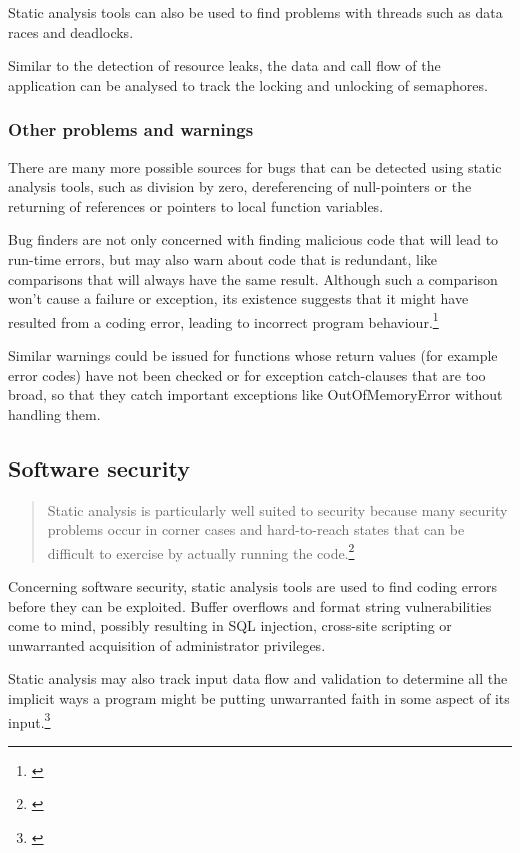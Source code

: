 Static analysis tools can also be used to find problems with threads such as data races and deadlocks.

Similar to the detection of resource leaks, the data and call flow of the application can be analysed to track the locking and unlocking of semaphores.

\subsubsection{Other problems and warnings}

There are many more possible sources for bugs that can be detected using static analysis tools, such as division by zero, dereferencing of null-pointers or the returning of references or pointers to local function variables.

Bug finders are not only concerned with finding malicious code that will lead to run-time errors, but may also warn about code that is redundant, like comparisons that will always have the same result. Although such a comparison won't cause a failure or exception, its existence suggests that it might have resulted from a coding error, leading to incorrect program behaviour.\footnote{\citep[1]{UsingSAToFindBugs}}

Similar warnings could be issued for functions whose return values (for example error codes) have not been checked or for exception catch-clauses that are too broad, so that they catch important exceptions like OutOfMemoryError without handling them.

\subsection{Software security}

\begin{quotation}
Static analysis is particularly well suited to security because many security problems occur in corner cases and hard-to-reach states that can be difficult to exercise by actually running the code.\footnote{\citep[4]{SecureProgramming}}
\end{quotation}

Concerning software security, static analysis tools are used to find coding errors before they can be exploited. Buffer overflows and format string vulnerabilities come to mind, possibly resulting in SQL injection, cross-site scripting or unwarranted acquisition of administrator privileges. 

Static analysis may also track input data flow and validation to determine
all the implicit ways a program might be putting unwarranted faith in some aspect of its input.\footnote{\citep[172]{SecureProgramming}}

